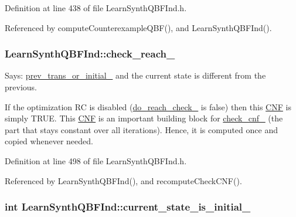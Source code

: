 Definition at line 438 of file Learn\-Synth\-Q\-B\-F\-Ind.\-h.



Referenced by compute\-Counterexample\-Q\-B\-F(), and Learn\-Synth\-Q\-B\-F\-Ind().

\hypertarget{classLearnSynthQBFInd_a6854254065f912e3d5fe07a1b895f1c6}{
\subsubsection[{check\-\_\-reach\-\_\-}]{ Learn\-Synth\-Q\-B\-F\-Ind\-::check\-\_\-reach\-\_\-\hspace{0.3cm}{\ttfamily [protected]}}}\label{classLearnSynthQBFInd_a6854254065f912e3d5fe07a1b895f1c6}


Says\-: \hyperlink{classLearnSynthQBFInd_ad99eafb7ee9134115f9fbe986e5eb0c5}{prev\-\_\-trans\-\_\-or\-\_\-initial\-\_\-} and the current state is different from the previous. 

If the optimization R\-C is disabled (\hyperlink{classLearnSynthQBFInd_af87e4a2c1d17c4c5bc398082d6d3e365}{do\-\_\-reach\-\_\-check\-\_\-} is false) then this \hyperlink{classCNF}{C\-N\-F} is simply T\-R\-U\-E. This \hyperlink{classCNF}{C\-N\-F} is an important building block for \hyperlink{classLearnSynthQBFInd_ac90a4574da82c96888db219291368554}{check\-\_\-cnf\-\_\-} (the part that stays constant over all iterations). Hence, it is computed once and copied whenever needed. 

Definition at line 498 of file Learn\-Synth\-Q\-B\-F\-Ind.\-h.



Referenced by Learn\-Synth\-Q\-B\-F\-Ind(), and recompute\-Check\-C\-N\-F().

\hypertarget{classLearnSynthQBFInd_a36e64e8ac156ca4978e73be5493de782}{
\subsubsection[{current\-\_\-state\-\_\-is\-\_\-initial\-\_\-}]{\setlength{\rightskip}{0pt plus 5cm}int Learn\-Synth\-Q\-B\-F\-Ind\-::current\-\_\-state\-\_\-is\-\_\-initial\-\_\-\hspace{0.3cm}{\ttfamily [protected]}}}\label{classLearnSynthQBFInd_a36e64e8ac156ca4978e73be5493de782}


